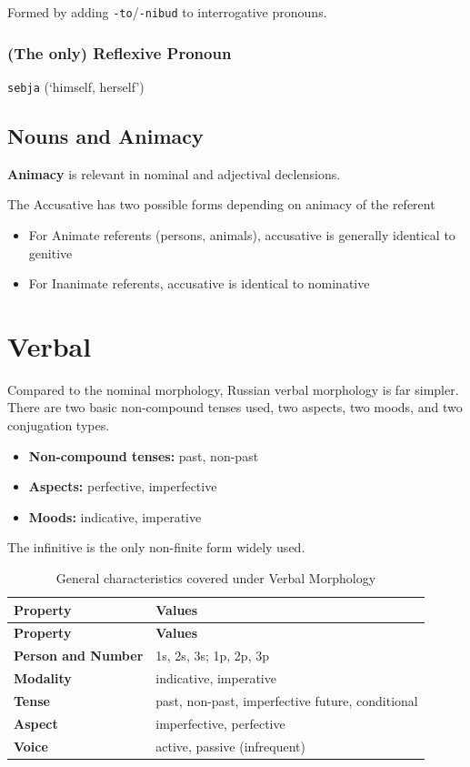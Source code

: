 \documentclass[
  a4paperpaper,
]{report}
\providecommand{\tightlist}{%
  \setlength{\itemsep}{0pt}\setlength{\parskip}{0pt}}
\begin{document}
Formed by adding \texttt{-to}/\texttt{-nibud} to interrogative pronouns.

\hypertarget{the-only-reflexive-pronoun}{%
\subsection{(The only) Reflexive
Pronoun}\label{the-only-reflexive-pronoun}}

\texttt{sebja} (`himself, herself')

\hypertarget{nouns-and-animacy}{%
\section{Nouns and Animacy}\label{nouns-and-animacy}}

\textbf{Animacy} is relevant in nominal and adjectival declensions.

The Accusative has two possible forms depending on animacy of the
referent

\begin{itemize}
\tightlist
\item
  For Animate referents (persons, animals), accusative is generally
  identical to genitive
\item
  For Inanimate referents, accusative is identical to nominative
\end{itemize}

\hypertarget{verbal}{%
\chapter{Verbal}\label{verbal}}

Compared to the nominal morphology, Russian verbal morphology is far
simpler. There are two basic non-compound tenses used, two aspects, two
moods, and two conjugation types.

\begin{itemize}
\tightlist
\item
  \textbf{Non-compound tenses:} past, non-past
\item
  \textbf{Aspects:} perfective, imperfective
\item
  \textbf{Moods:} indicative, imperative
\end{itemize}

The infinitive is the only non-finite form widely used.

\begin{longtable}[]{@{}ll@{}}
\caption{General characteristics covered under Verbal
Morphology}\tabularnewline
\toprule
\textbf{Property} & \textbf{Values}\tabularnewline
\midrule
\endfirsthead
\toprule
\textbf{Property} & \textbf{Values}\tabularnewline
\midrule
\endhead
\textbf{Person and Number} & 1s, 2s, 3s; 1p, 2p, 3p\tabularnewline
\textbf{Modality} & indicative, imperative\tabularnewline
\textbf{Tense} & past, non-past, imperfective future,
conditional\tabularnewline
\textbf{Aspect} & imperfective, perfective\tabularnewline
\textbf{Voice} & active, passive (infrequent)\tabularnewline
\bottomrule
\end{longtable}
\end{document}

